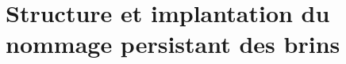 
\section{Structure et implantation du nommage persistant des brins}
\label{sec:implantation-nomination-persistante-brins}

